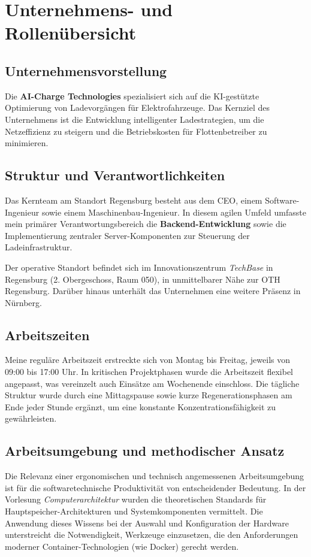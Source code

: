 \documentclass[12pt,a4paper]{report}
\begin{document}
\chapter{Unternehmens- und Rollenübersicht}    

\section{Unternehmensvorstellung}
Die \textbf{AI-Charge Technologies} spezialisiert sich auf die KI-gestützte Optimierung von Ladevorgängen für Elektrofahrzeuge. Das Kernziel des Unternehmens ist die Entwicklung intelligenter Ladestrategien, um die Netzeffizienz zu steigern und die Betriebskosten für Flottenbetreiber zu minimieren.

\section{Struktur und Verantwortlichkeiten}
Das Kernteam am Standort Regensburg besteht aus dem CEO, einem Software-Ingenieur sowie einem Maschinenbau-Ingenieur. In diesem agilen Umfeld umfasste mein primärer Verantwortungsbereich die \textbf{Backend-Entwicklung} sowie die Implementierung zentraler Server-Komponenten zur Steuerung der Ladeinfrastruktur.

Der operative Standort befindet sich im Innovationszentrum \textit{TechBase} in Regensburg (2. Obergeschoss, Raum 050), in unmittelbarer Nähe zur OTH Regensburg. Darüber hinaus unterhält das Unternehmen eine weitere Präsenz in Nürnberg.

\section{Arbeitszeiten}
Meine reguläre Arbeitszeit erstreckte sich von Montag bis Freitag, jeweils von 09:00 bis 17:00 Uhr. In kritischen Projektphasen wurde die Arbeitszeit flexibel angepasst, was vereinzelt auch Einsätze am Wochenende einschloss. Die tägliche Struktur wurde durch eine Mittagspause sowie kurze Regenerationsphasen am Ende jeder Stunde ergänzt, um eine konstante Konzentrationsfähigkeit zu gewährleisten.

\section{Arbeitsumgebung und methodischer Ansatz}
Die Relevanz einer ergonomischen und technisch angemessenen Arbeitsumgebung ist für die softwaretechnische Produktivität von entscheidender Bedeutung. In der Vorlesung \textit{Computerarchitektur} wurden die theoretischen Standards für Hauptspeicher-Architekturen und Systemkomponenten vermittelt. Die Anwendung dieses Wissens bei der Auswahl und Konfiguration der Hardware unterstreicht die Notwendigkeit, Werkzeuge einzusetzen, die den Anforderungen moderner Container-Technologien (wie Docker) gerecht werden.
\end{document}
